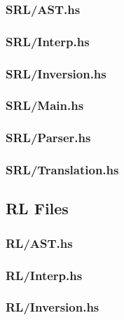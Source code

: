 \subsubsection{SRL/AST.hs}
\label{app:SRL_AST_hs}

\subsubsection{SRL/Interp.hs}
\label{app:SRL_Interp_hs}

\subsubsection{SRL/Inversion.hs}
\label{app:SRL_Inversion_hs}

\subsubsection{SRL/Main.hs}
\label{app:SRL_Main_hs}

\subsubsection{SRL/Parser.hs}
\label{app:SRL_Parser_hs}

\subsubsection{SRL/Translation.hs}
\label{app:SRL_Translation_hs}

\subsection{RL Files}
\label{app:RL_files}
\subsubsection{RL/AST.hs}
\label{app:RL_AST_hs}

\subsubsection{RL/Interp.hs}
\label{app:RL_Interp_hs}

\subsubsection{RL/Inversion.hs}
\label{app:RL_Inversion_hs}

